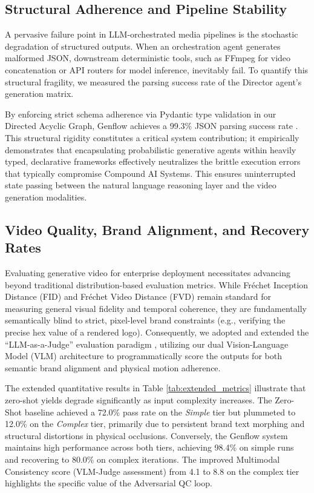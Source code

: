 \documentclass[sigconf]{acmart}
\begin{document}
\subsection{Structural Adherence and Pipeline Stability}

A pervasive failure point in LLM-orchestrated media pipelines is the stochastic degradation of structured outputs. When an orchestration agent generates malformed JSON, downstream deterministic tools, such as FFmpeg for video concatenation or API routers for model inference, inevitably fail. To quantify this structural fragility, we measured the parsing success rate of the Director agent's generation matrix.

By enforcing strict schema adherence via Pydantic type validation in our Directed Acyclic Graph, Genflow achieves a 99.3\% JSON parsing success rate \cite{pydantic2025}. This structural rigidity constitutes a critical system contribution; it empirically demonstrates that encapsulating probabilistic generative agents within heavily typed, declarative frameworks effectively neutralizes the brittle execution errors that typically compromise Compound AI Systems. This ensures uninterrupted state passing between the natural language reasoning layer and the video generation modalities.

\subsection{Video Quality, Brand Alignment, and Recovery Rates}

Evaluating generative video for enterprise deployment necessitates advancing beyond traditional distribution-based evaluation metrics. While Fréchet Inception Distance (FID) \cite{heusel2017gans} and Fréchet Video Distance (FVD) \cite{unterthiner2018towards} remain standard for measuring general visual fidelity and temporal coherence, they are fundamentally semantically blind to strict, pixel-level brand constraints (e.g., verifying the precise hex value of a rendered logo). Consequently, we adopted and extended the ``LLM-as-a-Judge'' evaluation paradigm \cite{zheng2023judging}, utilizing our dual Vision-Language Model (VLM) architecture to programmatically score the outputs for both semantic brand alignment and physical motion adherence.

The extended quantitative results in Table \ref{tab:extended_metrics} illustrate that zero-shot yields degrade significantly as input complexity increases. The Zero-Shot baseline achieved a 72.0\% pass rate on the \textit{Simple} tier but plummeted to 12.0\% on the \textit{Complex} tier, primarily due to persistent brand text morphing and structural distortions in physical occlusions. Conversely, the Genflow system maintains high performance across both tiers, achieving 98.4\% on simple runs and recovering to 80.0\% on complex iterations. The improved Multimodal Consistency score (VLM-Judge assessment) from 4.1 to 8.8 on the complex tier highlights the specific value of the Adversarial QC loop. 
\end{document}
